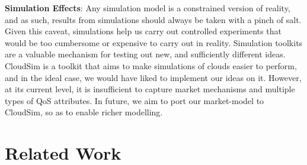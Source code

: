 \documentclass[10pt,journal,compsoc]{IEEEtran}
\begin{document}

\textbf{Simulation Effects}: Any simulation model is a constrained version of reality, and as such, results from simulations should always be taken with a pinch of salt. Given this caveat, simulations help us carry out controlled experiments that would be too cumbersome or expensive to carry out in reality. Simulation toolkits are a valuable mechanism for testing out new, and sufficiently different ideas. CloudSim \cite{Buyya2009Cloudbus} is a toolkit that aims to make simulations of clouds easier to perform, and in the ideal case, we would have liked to implement our ideas on it. However, at its current level, it is insufficient to capture market mechanisms and multiple types of QoS attributes. In future, we aim to port our market-model to CloudSim, so as to enable richer modelling.

\section{Related Work}
    
\end{document}
